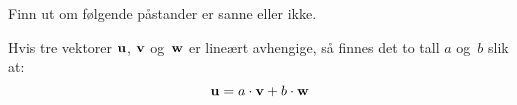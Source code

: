 
\begin{oppgave}
Finn ut om følgende påstander er sanne eller ikke.
\begin{punkt}
Hvis tre vektorer $\mathbf{u}$, $\mathbf{v}$ og~$\mathbf{w}$ er lineært
avhengige, så finnes det to tall $a$ og~$b$ slik at:
\[
\mathbf{u} = a \cdot \mathbf{v} + b \cdot \mathbf{w}
\]
\end{punkt}
\end{oppgave}
